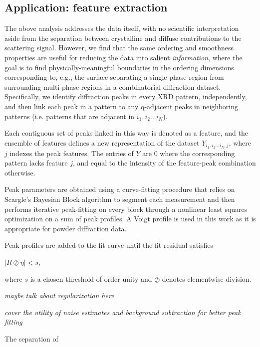 \documentclass[12pt]{iopart}
\begin{document}
\subsection{Application: feature extraction}
The above analysis addresses the data itself, with no scientific
interpretation aside from the separation between crystalline and diffuse
contributions to the scattering signal. However, we find that the same
ordering and smoothness properties are useful for reducing the data into
salient \emph{information}, where the goal is to find physically-meaningful
boundaries in the ordering dimensions corresponding to, e.g., the
surface separating a single-phase region from surrounding multi-phase
regions in a combinatorial diffraction dataset. Specifically, we 
identify diffraction peaks in every XRD pattern, independently, and then
link each peak in a pattern to any q-adjacent peaks in neighboring patterns (i.e. patterns that are adjacent in $i_1, i_2 ... i_N$). 

Each contiguous set of peaks linked in this way is denoted as a feature, and the ensemble of features defines a new representation of the dataset $ Y_{i_1,i_2...i_N, j} $, where $j$ indexes the peak features. The entries of $Y$ are 0 where the corresponding pattern lacks feature $j$, and equal to the intensity of the feature-peak combination otherwise.

Peak parameters are obtained using a curve-fitting procedure that relies on Scargle's Bayesian Block algorithm to segment each measurement and then performs iterative peak-fitting on every block through a nonlinear least squares optimization on a sum of peak profiles. A Voigt profile is used in this work as it is appropriate for powder diffraction data. 

Peak profiles are added to the fit curve until the fit residual satisfies

$
|R \oslash \eta| < s,
$

where $s$ is a chosen threshold of order unity and $\oslash$ denotes elementwise division.

\emph{maybe talk about regularization here}

\emph{cover the utility of noise estimates and background subtraction for better peak fitting}

The separation of 
\end{document}
